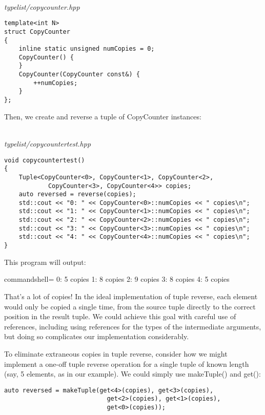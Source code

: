 \hspace*{\fill} \\ %
\noindent
\textit{typelist/copycounter.hpp}
\begin{lstlisting}[style=styleCXX]
template<int N>
struct CopyCounter
{
	inline static unsigned numCopies = 0;
	CopyCounter() {
	}
	CopyCounter(CopyCounter const&) {
		++numCopies;
	}
};
\end{lstlisting}

Then, we create and reverse a tuple of CopyCounter instances:

\hspace*{\fill} \\ %
\noindent
\textit{typelist/copycountertest.hpp}
\begin{lstlisting}[style=styleCXX]
void copycountertest()
{
	Tuple<CopyCounter<0>, CopyCounter<1>, CopyCounter<2>,
			CopyCounter<3>, CopyCounter<4>> copies;
	auto reversed = reverse(copies);
	std::cout << "0: " << CopyCounter<0>::numCopies << " copies\n";
	std::cout << "1: " << CopyCounter<1>::numCopies << " copies\n";
	std::cout << "2: " << CopyCounter<2>::numCopies << " copies\n";
	std::cout << "3: " << CopyCounter<3>::numCopies << " copies\n";
	std::cout << "4: " << CopyCounter<4>::numCopies << " copies\n";
}
\end{lstlisting}

This program will output:

\begin{tcblisting}{commandshell={}}
0: 5 copies
1: 8 copies
2: 9 copies
3: 8 copies
4: 5 copies
\end{tcblisting}

That’s a lot of copies! In the ideal implementation of tuple reverse, each element would only be copied a single time, from the source tuple directly to the correct position in the result tuple. We could achieve this goal with careful use of references, including using references for the types of the intermediate arguments, but doing so complicates our implementation considerably.

To eliminate extraneous copies in tuple reverse, consider how we might implement a one-off tuple reverse operation for a single tuple of known length (say, 5 elements, as in our example). We could simply use makeTuple() and get():

\begin{lstlisting}[style=styleCXX]
auto reversed = makeTuple(get<4>(copies), get<3>(copies),
							get<2>(copies), get<1>(copies),
							get<0>(copies));
\end{lstlisting}

